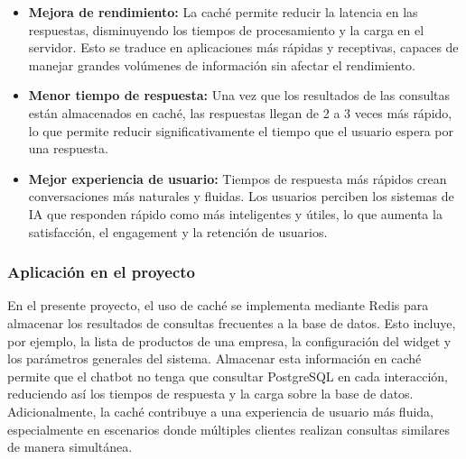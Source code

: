 \begin{itemize}
    \item \textbf{Mejora de rendimiento:} La caché permite reducir la latencia en las respuestas, disminuyendo los tiempos de procesamiento y la carga en el servidor. Esto se traduce en aplicaciones más rápidas y receptivas, capaces de manejar grandes volúmenes de información sin afectar el rendimiento. \cite{adaline2025promptcaching}

    \item \textbf{Menor tiempo de respuesta:} Una vez que los resultados de las consultas están almacenados en caché, las respuestas llegan de 2 a 3 veces más rápido, lo que permite reducir significativamente el tiempo que el usuario espera por una respuesta. \cite{adaline2025promptcaching}

    \item \textbf{Mejor experiencia de usuario:} Tiempos de respuesta más rápidos crean conversaciones más naturales y fluidas. Los usuarios perciben los sistemas de IA que responden rápido como más inteligentes y útiles, lo que aumenta la satisfacción, el engagement y la retención de usuarios. \cite{adaline2025promptcaching}
\end{itemize}

\subsubsection{Aplicación en el proyecto}
\label{subsec:cache_aplicacion}

En el presente proyecto, el uso de caché se implementa mediante Redis para almacenar los resultados de consultas frecuentes a la base de datos. Esto incluye, por ejemplo, la lista de productos de una empresa, la configuración del widget y los parámetros generales del sistema. Almacenar esta información en caché permite que el chatbot no tenga que consultar PostgreSQL en cada interacción, reduciendo así los tiempos de respuesta y la carga sobre la base de datos. Adicionalmente, la caché contribuye a una experiencia de usuario más fluida, especialmente en escenarios donde múltiples clientes realizan consultas similares de manera simultánea.